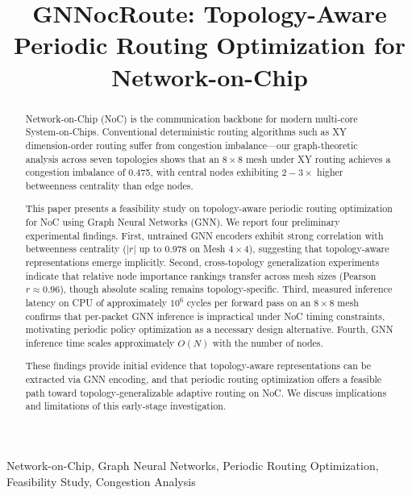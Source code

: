 \documentclass[conference]{IEEEtran}
\begin{document}
\title{GNNocRoute: Topology-Aware Periodic Routing Optimization for Network-on-Chip}

\author{
}

\maketitle

\begin{abstract}
Network-on-Chip (NoC) is the communication backbone for modern multi-core System-on-Chips. Conventional deterministic routing algorithms such as XY dimension-order routing suffer from congestion imbalance---our graph-theoretic analysis across seven topologies shows that an $8\times8$ mesh under XY routing achieves a congestion imbalance of 0.475, with central nodes exhibiting $2-3\times$ higher betweenness centrality than edge nodes.

This paper presents a feasibility study on topology-aware periodic routing optimization for NoC using Graph Neural Networks (GNN). We report four preliminary experimental findings. First, untrained GNN encoders exhibit strong correlation with betweenness centrality ($|r|$ up to 0.978 on Mesh $4\times4$), suggesting that topology-aware representations emerge implicitly. Second, cross-topology generalization experiments indicate that relative node importance rankings transfer across mesh sizes (Pearson $r \approx 0.96$), though absolute scaling remains topology-specific. Third, measured inference latency on CPU of approximately $10^6$ cycles per forward pass on an $8\times8$ mesh confirms that per-packet GNN inference is impractical under NoC timing constraints, motivating periodic policy optimization as a necessary design alternative. Fourth, GNN inference time scales approximately $O(N)$ with the number of nodes.

These findings provide initial evidence that topology-aware representations can be extracted via GNN encoding, and that periodic routing optimization offers a feasible path toward topology-generalizable adaptive routing on NoC. We discuss implications and limitations of this early-stage investigation.
\end{abstract}

\begin{IEEEkeywords}
Network-on-Chip, Graph Neural Networks, Periodic Routing Optimization, Feasibility Study, Congestion Analysis
\end{IEEEkeywords}
\end{document}
